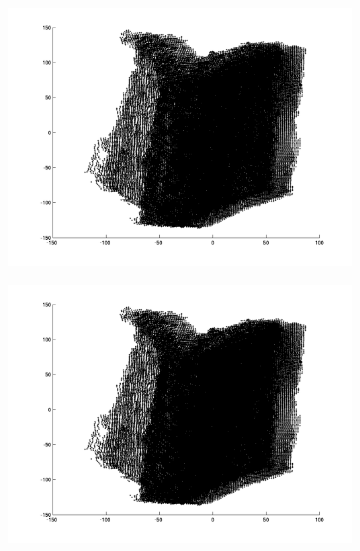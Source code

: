 \begin{figure}[H]
	\begin{subfigure}[b]{0.3\textwidth}
		\centering
		\includegraphics[width=\textwidth]{Images/Book7.png}
		\caption{}
	\end{subfigure}%
	\begin{subfigure}[b]{0.3\textwidth}
		\centering
		\includegraphics[width=\textwidth]{Images/Book8.png}
		\caption{}
	\end{subfigure}
	\begin{subfigure}[b]{0.3\textwidth}
		\centering

\end{subfigure}
\end{figure}

